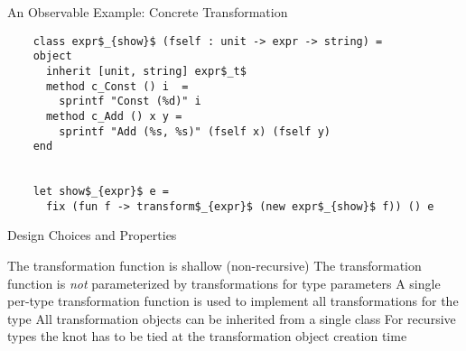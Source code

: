\documentclass{beamer}
\theoremstyle{definition}
\theoremstyle{plain} %
\begin{document}
\begin{frame}[fragile]{An Observable Example: Concrete Transformation}
  \begin{lstlisting}
    class expr$_{show}$ (fself : unit -> expr -> string) =
    object
      inherit [unit, string] expr$_t$ 
      method c_Const () i  =
        sprintf "Const (%d)" i      
      method c_Add () x y =
        sprintf "Add (%s, %s)" (fself x) (fself y)
    end

    
    let show$_{expr}$ e =
      fix (fun f -> transform$_{expr}$ (new expr$_{show}$ f)) () e
  \end{lstlisting}
\end{frame}


\begin{comment}
  We now recap/state the major design choices and properties of our framework:

  1. We use open recursion~--- the generic transformation function is shallow and non-recursive, and we tie the
  knot at the concrete transformation object creation time.

  2. The single generic transformation function is used to implement all concrete transformations.

  3. Neither the generic function nor the generic transformation class are parameterized with transformations for type-parameters.
  This, again, is done on a concrete transformation class/object implementation level.  
\end{comment}

\begin{frame}[fragile]{Design Choices and Properties}

  The transformation function is shallow (non-recursive)
  \vskip5mm
  The transformation function is \emph{not} parameterized by transformations for type parameters
  \vskip5mm
  A single per-type transformation function is used to implement all transformations for the type
  \vskip5mm
  All transformation objects can be inherited from a single class
  \vskip5mm
  For recursive types the knot has to be tied at the transformation object creation time
  
\end{frame}

\end{document}
